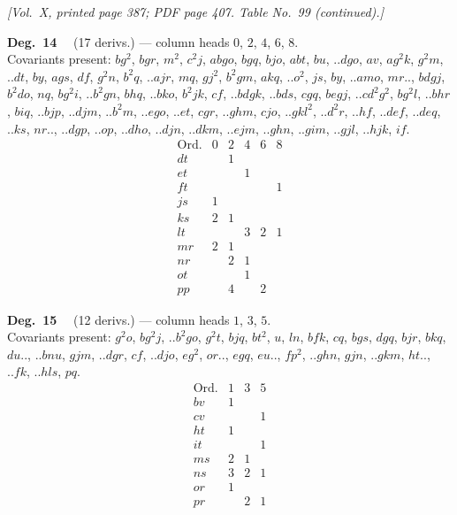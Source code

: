 \documentclass[11pt]{article}
\begin{document}
\newpage

\noindent\textit{[Vol.~X, printed page 387; PDF page 407. Table No.~99 (continued).]}

\bigskip

\noindent\textbf{Deg.~14} \ \ (17 derivs.) --- column heads $0$, $2$, $4$, $6$, $8$. \\
Covariants present: $bg^{2}$, $bgr$, $m^{2}$, $c^{2}j$, $abgo$, $bgq$, $bjo$, $abt$, $bu$, $..dgo$, $av$, $ag^{2}k$, $g^{2}m$, $..dt$, $by$, $ags$, $df$, $g^{2}n$, $b^{2}q$, $..ajr$, $mq$, $gj^{2}$, $b^{2}gm$, $akq$, $..o^{2}$, $js$, $by$, $..amo$, $mr..$, $bdgj$, $b^{2}do$, $nq$, $bg^{2}i$, $..b^{2}gn$, $bhq$, $..bko$, $b^{2}jk$, $cf$, $..bdgk$, $..bds$, $cgq$, $begj$, $..cd^{2}g^{2}$, $bg^{2}l$, $..bhr$, $biq$, $..bjp$, $..djm$, $..b^{2}m$, $..ego$, $..et$, $cgr$, $..ghm$, $cjo$, $..gkl^{2}$, $..d^{2}r$, $..hf$, $..def$, $..deq$, $..ks$, $nr..$, $..dgp$, $..op$, $..dho$, $..djn$, $..dkm$, $..ejm$, $..ghn$, $..gim$, $..gjl$, $..hjk$, $if$.
\[
\begin{array}{l|ccccc}
\text{Ord.} & 0 & 2 & 4 & 6 & 8 \\\hline
dt & & 1 & & & \\
et & & & 1 & & \\
ft & & & & & 1 \\
js & 1 & & & & \\
ks & 2 & 1 & & & \\
lt & & & 3 & 2 & 1 \\
mr & 2 & 1 & & & \\
nr & & 2 & 1 & & \\
ot & & & 1 & & \\
pp & & 4 & & 2 &
\end{array}
\]

\bigskip

\noindent\textbf{Deg.~15} \ \ (12 derivs.) --- column heads $1$, $3$, $5$. \\
Covariants present: $g^{2}o$, $bg^{2}j$, $..b^{2}go$, $g^{2}t$, $bjq$, $bt^{2}$, $u$, $ln$, $bfk$, $cq$, $bgs$, $dgq$, $bjr$, $bkq$, $du..$, $..bnu$, $gjm$, $..dgr$, $cf$, $..djo$, $eg^{2}$, $or..$, $egq$, $eu..$, $fp^{2}$, $..ghn$, $gjn$, $..gkm$, $ht..$, $..fk$, $..hls$, $pq$.
\[
\begin{array}{l|ccc}
\text{Ord.} & 1 & 3 & 5 \\\hline
bv & 1 & & \\
cv & & & 1 \\
ht & 1 & & \\
it & & & 1 \\
ms & 2 & 1 & \\
ns & 3 & 2 & 1 \\
or & 1 & & \\
pr & & 2 & 1
\end{array}
\]
\end{document}
